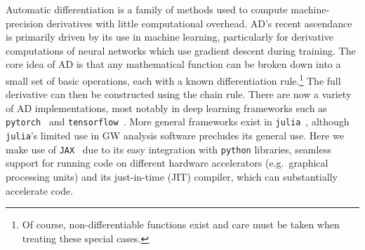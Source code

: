 \documentclass[twocolumn]{aastex631}
\newcommand{\jax}{\texttt{JAX}\xspace}
\begin{document}
Automatic differentiation is a family of methods used to compute machine-precision derivatives with little computational overhead. 
AD's recent ascendance is primarily driven by its use in machine learning, particularly for derivative computations of neural networks which use gradient descent during training.
The core idea of AD is that any mathematical function can be broken down into a small set of basic operations, each with a known differentiation rule.\footnote{
    Of course, non-differentiable functions exist and care must be taken when treating these special cases.
    }
The full derivative can then be constructed using the chain rule.
There are now a variety of AD implementations, most notably in deep learning frameworks such as \texttt{pytorch}~\citep{pytorch} and \texttt{tensorflow}~\citep{tensorflow2015-whitepaper}.
More general frameworks exist in \texttt{julia}~\citep{zygote, forwarddiff}, although \texttt{julia}'s limited use in GW analysis software precludes its general use.
Here we make use of \jax~\citep{jax2018github} due to its easy integration with \texttt{python} libraries, seamless support for running code on different hardware accelerators (e.g.\ graphical processing units) and its just-in-time (JIT) compiler, which can substantially accelerate code.
\end{document}
